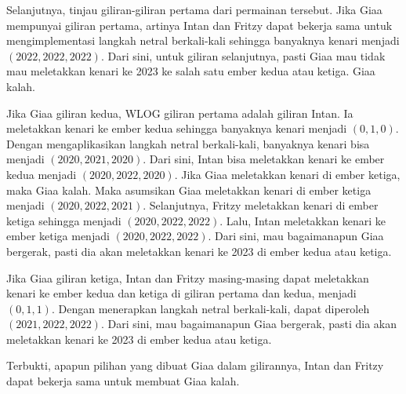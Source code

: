 \documentclass[11pt]{scrartcl}
\begin{document}
\begin{enumerate}[resume]
\begin{solusi}
        Selanjutnya, tinjau giliran-giliran pertama dari permainan tersebut. Jika Giaa mempunyai giliran pertama, artinya Intan dan Fritzy dapat bekerja sama untuk mengimplementasi langkah netral berkali-kali sehingga banyaknya kenari menjadi $(2022,2022,2022)$. Dari sini, untuk giliran selanjutnya, pasti Giaa mau tidak mau meletakkan kenari ke 2023 ke salah satu ember kedua atau ketiga. Giaa kalah.

        Jika Giaa giliran kedua, WLOG giliran pertama adalah giliran Intan. Ia meletakkan kenari ke ember kedua sehingga banyaknya kenari menjadi $(0,1,0)$. Dengan mengaplikasikan langkah netral berkali-kali, banyaknya kenari bisa menjadi $(2020,2021,2020)$. Dari sini, Intan bisa meletakkan kenari ke ember kedua menjadi $(2020,2022,2020)$. Jika Giaa meletakkan kenari di ember ketiga, maka Giaa kalah. Maka asumsikan Giaa meletakkan kenari di ember ketiga menjadi $(2020,2022,2021)$. Selanjutnya, Fritzy meletakkan kenari di ember ketiga sehingga menjadi $(2020,2022,2022)$. Lalu, Intan meletakkan kenari ke ember ketiga menjadi $(2020,2022,2022)$. Dari sini, mau bagaimanapun Giaa bergerak, pasti dia akan meletakkan kenari ke 2023 di ember kedua atau ketiga.

        Jika Giaa giliran ketiga, Intan dan Fritzy masing-masing dapat meletakkan kenari ke ember kedua dan ketiga di giliran pertama dan kedua, menjadi $(0,1,1)$. Dengan menerapkan langkah netral berkali-kali, dapat diperoleh $(2021,2022,2022)$. Dari sini, mau bagaimanapun Giaa bergerak, pasti dia akan meletakkan kenari ke 2023 di ember kedua atau ketiga.

        Terbukti, apapun pilihan yang dibuat Giaa dalam gilirannya, Intan dan Fritzy dapat bekerja sama untuk membuat Giaa kalah.
    \end{solusi}
\end{enumerate}
\end{document}
